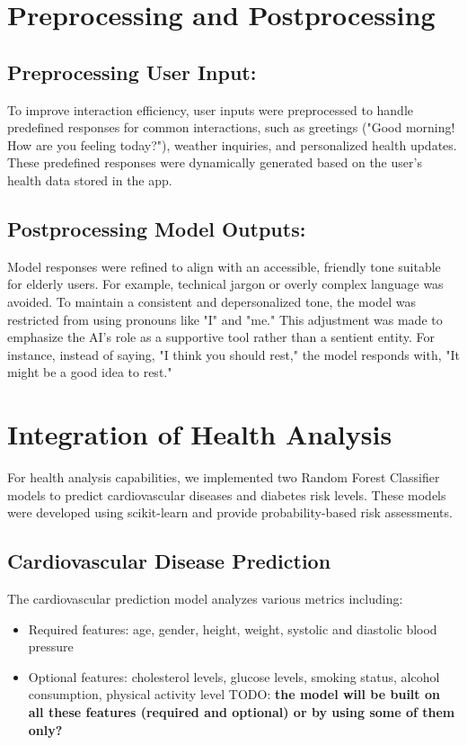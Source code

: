 \documentclass[runningheads,a4paper,11pt]{report}
\newcommand{\todoL}[1]{{\color{green} TODO: \color{green} \textbf{#1}}}
\begin{document}
\section{Preprocessing and Postprocessing}

\subsection{Preprocessing User Input:}
 To improve interaction efficiency, user inputs were preprocessed to handle predefined responses for common interactions, such as greetings ("Good morning! How are you feeling today?"), weather inquiries, and personalized health updates. These predefined responses were dynamically generated based on the user's health data stored in the app.
\subsection{Postprocessing Model Outputs:}
 Model responses were refined to align with an accessible, friendly tone suitable for elderly users. For example, technical jargon or overly complex language was avoided. To maintain a consistent and depersonalized tone, the model was restricted from using pronouns like "I" and "me." This adjustment was made to emphasize the AI's role as a supportive tool rather than a sentient entity. For instance, instead of saying, "I think you should rest," the model responds with, "It might be a good idea to rest."
 
\section{Integration of Health Analysis}
For health analysis capabilities, we implemented two Random Forest Classifier models to predict cardiovascular diseases and diabetes risk levels. These models were developed using scikit-learn and provide probability-based risk assessments.

\subsection{Cardiovascular Disease Prediction}
The cardiovascular prediction model analyzes various metrics including:
\begin{itemize}
    \item Required features: age, gender, height, weight, systolic and diastolic blood pressure
    \item Optional features: cholesterol levels, glucose levels, smoking status, alcohol consumption, physical activity level
    \todoL{the model will be built on all these features (required and optional) or by using some of them only?}
\end{itemize}
\end{document}

